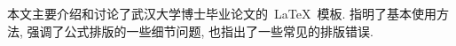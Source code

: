 \begin{cnabstract}
本文主要介绍和讨论了武汉大学博士毕业论文的~\LaTeX~模板.
指明了基本使用方法, 强调了公式排版的一些细节问题, 也指出了一些常见的排版错误.
\end{cnabstract}

\vspace{1em}

